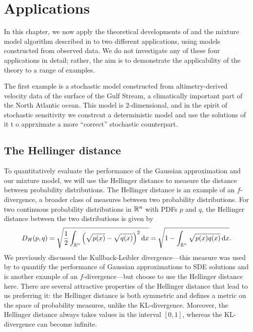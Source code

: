 \chapter{Applications}\label{ch:appls}
In this chapter, we now apply the theoretical developments of  and the mixture model algorithm described in  to two different applications, using models constructed from observed data.
We do not investigate any of these four applications in detail; rather, the aim is to demonstrate the applicability of the theory to a range of examples.


The first example is a stochastic model constructed from altimetry-derived velocity data of the surface of the Gulf Stream, a climatically important part of the North Atlantic ocean.
This model is 2-dimensional, and in the spirit of stochastic sensitivity we constrcut a deterministic model and use the solutions of it t o apprximate a more ``correct'' stochastic counterpart.


\section{The Hellinger distance}
To quantitatively evaluate the performance of the Gaussian approximation and our mixture model, we will use the Hellinger distance to measure the distance between probability distributions.
The Hellinger distance is an example of an \(f\)-divergence, a broader class of measures between two probability distributions.
For two continuous probability distributions in \(\mathbb{R}^n\) with PDFs \(p\) and \(q\), the Hellinger distance between the two distributions is given by
\begin{equation}\label{eqn:hell_dist}
	D_H\!\left(p, q\right) = \sqrt{\frac12 \int_{\R^n}{\left(\sqrt{p(x)} - \sqrt{q(x)}\right)^2\dif x}} = \sqrt{1 - \int_{\R^n}{\sqrt{p(x)q(x)}\dif x}}.
\end{equation}
We previously discussed the Kullback-Leibler divergence---this measure was used by \citet{Sanz-AlonsoStuart_2017_GaussianApproximationsSmall} to quantify the performance of Gaussian approximations to SDE solutions and is another example of an \(f\)-divergence---but choose to use the Hellinger distance here.
There are several attractive properties of the Hellinger distance that lead to us preferring it: the Hellinger distance is both symmetric and defines a metric on the space of probability measures, unlike the KL-divergence.
Moreover, the Hellinger distance always takes values in the interval \([0,1]\), whereas the KL-divergence can become infinite.

